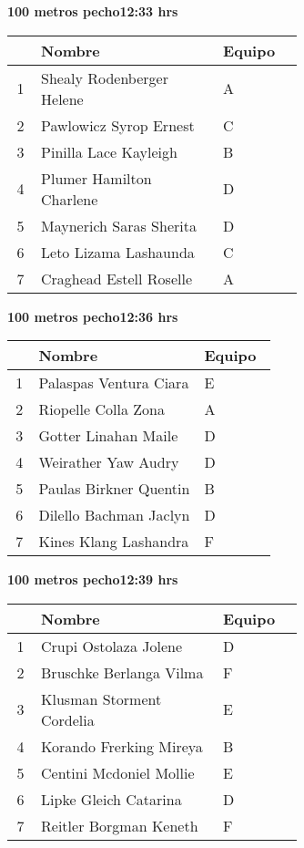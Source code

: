 \begin{minipage}{0.95\linewidth}
\begin{center}
\textbf{
100 metros pecho\hspace{1cm}12:33 hrs}
\end{center}
\begin{tabular}{cp{0.63\linewidth}l}
\hline
& \textbf{Nombre} & \textbf{Equipo} \\ \hline
1 & Shealy Rodenberger Helene & A \\ 
2 & Pawlowicz Syrop Ernest & C \\ 
3 & Pinilla Lace Kayleigh & B \\ 
4 & Plumer Hamilton Charlene & D \\ 
5 & Maynerich Saras Sherita & D \\ 
6 & Leto Lizama Lashaunda & C \\ 
7 & Craghead Estell Roselle & A \\ 
\end{tabular}
\end{minipage}
\begin{minipage}{0.95\linewidth}
\begin{center}
\textbf{
100 metros pecho\hspace{1cm}12:36 hrs}
\end{center}
\begin{tabular}{cp{0.63\linewidth}l}
\hline
& \textbf{Nombre} & \textbf{Equipo} \\ \hline
1 & Palaspas Ventura Ciara & E \\ 
2 & Riopelle Colla Zona & A \\ 
3 & Gotter Linahan Maile & D \\ 
4 & Weirather Yaw Audry & D \\ 
5 & Paulas Birkner Quentin & B \\ 
6 & Dilello Bachman Jaclyn & D \\ 
7 & Kines Klang Lashandra & F \\ 
\end{tabular}
\end{minipage}
\begin{minipage}{0.95\linewidth}
\begin{center}
\textbf{
100 metros pecho\hspace{1cm}12:39 hrs}
\end{center}
\begin{tabular}{cp{0.63\linewidth}l}
\hline
& \textbf{Nombre} & \textbf{Equipo} \\ \hline
1 & Crupi Ostolaza Jolene & D \\ 
2 & Bruschke Berlanga Vilma & F \\ 
3 & Klusman Storment Cordelia & E \\ 
4 & Korando Frerking Mireya & B \\ 
5 & Centini Mcdoniel Mollie & E \\ 
6 & Lipke Gleich Catarina & D \\ 
7 & Reitler Borgman Keneth & F \\ 
\end{tabular}
\end{minipage}
